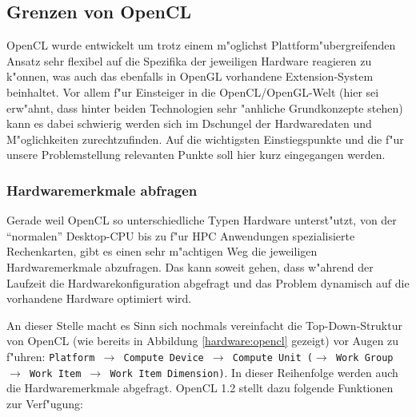 \begin{refsection}
\subsection{Grenzen von OpenCL}

OpenCL wurde entwickelt um trotz einem m"oglichst Plattform"ubergreifenden Ansatz 
sehr flexibel auf die Spezifika der jeweiligen Hardware reagieren zu k"onnen, was
auch das ebenfalls in OpenGL vorhandene Extension-System beinhaltet. Vor allem f"ur
Einsteiger in die OpenCL/OpenGL-Welt (hier sei erw"ahnt, dass hinter beiden 
Technologien sehr "anhliche Grundkonzepte stehen) kann es dabei schwierig werden
sich im Dschungel der Hardwaredaten und M"oglichkeiten zurechtzufinden. Auf die 
wichtigsten Einstiegspunkte und die f"ur unsere Problemstellung relevanten Punkte
soll hier kurz eingegangen werden.


\subsubsection{Hardwaremerkmale abfragen}

Gerade weil OpenCL so unterschiedliche Typen Hardware unterst"utzt, von der ``normalen''
Desktop-CPU bis zu f"ur HPC Anwendungen spezialisierte Rechenkarten, gibt es einen
sehr m"achtigen Weg die jeweiligen Hardwaremerkmale abzufragen. Das kann soweit 
gehen, dass w"ahrend der Laufzeit die Hardwarekonfiguration abgefragt und das 
Problem dynamisch auf die vorhandene Hardware optimiert wird.

An dieser Stelle macht es Sinn sich nochmals vereinfacht die Top-Down-Struktur
von OpenCL (wie bereits in Abbildung \ref{hardware:opencl} gezeigt) vor Augen zu
f"uhren: \texttt{Platform $\rightarrow$ Compute Device $\rightarrow$ Compute
	Unit ($\rightarrow$ Work Group $\rightarrow$ Work Item $\rightarrow$ Work Item
Dimension)}. In dieser Reihenfolge werden auch die Hardwaremerkmale abgefragt.
OpenCL 1.2 stellt dazu folgende Funktionen zur Verf"ugung:


\end{refsection}
